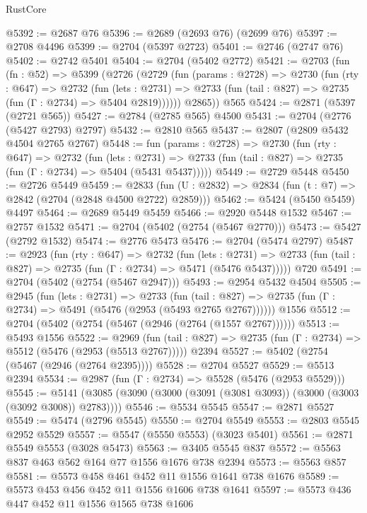 \begin{lexlean}{RustCore}
\begin{coremodule}
@5392 := @2687 @76
@5396 := @2689 (@2693 @76) (@2699 @76)
@5397 := @2708 @4496
@5399 := @2704 (@5397 @2723)
@5401 := @2746 (@2747 @76)
@5402 := @2742 @5401
@5404 := @2704 (@5402 @2772)
@5421 := @2703
    (fun (fn : @52) =>
    @5399
      (@2726
        (@2729
          (fun (params : @2728) =>
          @2730
            (fun (rty : @647) =>
            @2732
              (fun (lets : @2731) =>
              @2733 (fun (tail : @827) => @2735 (fun (Γ : @2734) => @5404 @2819))))))
        @2865))
    @565
@5424 := @2871 (@5397 (@2721 @565))
@5427 := @2784 (@2785 @565) @4500
@5431 := @2704 (@2776 (@5427 @2793) @2797)
@5432 := @2810 @565
@5437 := @2807 (@2809 @5432 @4504 @2765 @2767)
@5448 := fun (params : @2728) =>
  @2730
    (fun (rty : @647) =>
    @2732
      (fun (lets : @2731) =>
      @2733 (fun (tail : @827) => @2735 (fun (Γ : @2734) => @5404 (@5431 @5437)))))
@5449 := @2729 @5448
@5450 := @2726 @5449
@5459 := @2833 (fun (U : @2832) => @2834 (fun (t : @7) => @2842 (@2704 (@2848 @4500 @2722) @2859)))
@5462 := @5424 (@5450 @5459) @4497
@5464 := @2689 @5449 @5459
@5466 := @2920 @5448 @1532
@5467 := @2757 @1532
@5471 := @2704 (@5402 (@2754 (@5467 @2770)))
@5473 := @5427 (@2792 @1532)
@5474 := @2776 @5473
@5476 := @2704 (@5474 @2797)
@5487 := @2923
    (fun (rty : @647) =>
    @2732
      (fun (lets : @2731) =>
      @2733 (fun (tail : @827) => @2735 (fun (Γ : @2734) => @5471 (@5476 @5437)))))
    @720
@5491 := @2704 (@5402 (@2754 (@5467 @2947)))
@5493 := @2954 @5432 @4504
@5505 := @2945
    (fun (lets : @2731) =>
    @2733
      (fun (tail : @827) => @2735 (fun (Γ : @2734) => @5491 (@5476 (@2953 (@5493 @2765 @2767))))))
    @1556
@5512 := @2704 (@5402 (@2754 (@5467 (@2946 (@2764 (@1557 @2767))))))
@5513 := @5493 @1556
@5522 := @2969
    (fun (tail : @827) => @2735 (fun (Γ : @2734) => @5512 (@5476 (@2953 (@5513 @2767)))))
    @2394
@5527 := @5402 (@2754 (@5467 (@2946 (@2764 @2395))))
@5528 := @2704 @5527
@5529 := @5513 @2394
@5534 := @2987 (fun (Γ : @2734) => @5528 (@5476 (@2953 @5529)))
@5545 := @5141 (@3085 (@3090 (@3000 (@3091 (@3081 @3093)) (@3000 (@3003 (@3092 @3008)) @2783))))
@5546 := @5534 @5545
@5547 := @2871 @5527
@5549 := @5474 (@2796 @5545)
@5550 := @2704 @5549
@5553 := @2803 @5545 @2952 @5529
@5557 := @5547 (@5550 @5553) (@3023 @5401)
@5561 := @2871 @5549 @5553 (@3028 @5473)
@5563 := @3405 @5545 @837
@5572 := @5563 @837 @463 @562 @164 @77 @1556 @1676 @738 @2394
@5573 := @5563 @857
@5581 := @5573 @458 @461 @452 @11 @1556 @1641 @738 @1676
@5589 := @5573 @453 @456 @452 @11 @1556 @1606 @738 @1641
@5597 := @5573 @436 @447 @452 @11 @1556 @1565 @738 @1606

\end{coremodule}
\end{lexlean}

